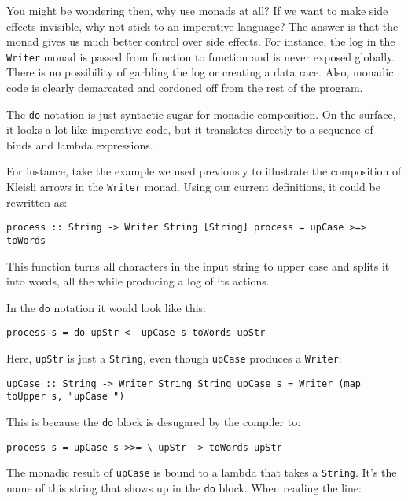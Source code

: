 You might be wondering then, why use monads at all? If we want to make
side effects invisible, why not stick to an imperative language? The
answer is that the monad gives us much better control over side effects.
For instance, the log in the \texttt{Writer} monad is passed from
function to function and is never exposed globally. There is no
possibility of garbling the log or creating a data race. Also, monadic
code is clearly demarcated and cordoned off from the rest of the
program.

The \texttt{do} notation is just syntactic sugar for monadic
composition. On the surface, it looks a lot like imperative code, but it
translates directly to a sequence of binds and lambda expressions.

For instance, take the example we used previously to illustrate the
composition of Kleisli arrows in the \texttt{Writer} monad. Using our
current definitions, it could be rewritten as:

\begin{verbatim}
process :: String -> Writer String [String] process = upCase >=> toWords
\end{verbatim}

This function turns all characters in the input string to upper case and
splits it into words, all the while producing a log of its actions.

In the \texttt{do} notation it would look like this:

\begin{verbatim}
process s = do upStr <- upCase s toWords upStr
\end{verbatim}

Here, \texttt{upStr} is just a \texttt{String}, even though
\texttt{upCase} produces a \texttt{Writer}:

\begin{verbatim}
upCase :: String -> Writer String String upCase s = Writer (map toUpper s, "upCase ")
\end{verbatim}

This is because the \texttt{do} block is desugared by the compiler to:

\begin{verbatim}
process s = upCase s >>= \ upStr -> toWords upStr
\end{verbatim}

The monadic result of \texttt{upCase} is bound to a lambda that takes a
\texttt{String}. It's the name of this string that shows up in the
\texttt{do} block. When reading the line:

